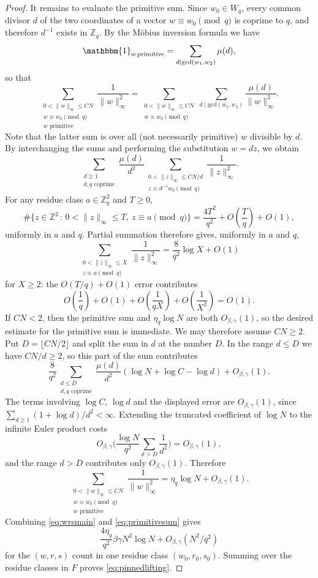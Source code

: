 \documentclass[11pt,reqno]{amsart}
\numberwithin{equation}{section}
\newcommand{\norm}[1]{\lVert #1\rVert_\infty}
\renewcommand{\leq}{\leqslant}
\renewcommand{\le}{\leqslant}
\renewcommand{\geq}{\geqslant}
\renewcommand{\ge}{\geqslant}
\begin{document}
\begin{proof}
It remains to evaluate the primitive sum. Since $w_0\in W_q$, every common divisor $d$ of the two coordinates of a vector $w\equiv w_0\pmod q$ is coprime to $q$, and therefore $d^{-1}$ exists in $\mathbb{Z}_{q}$. By the M\"{o}bius inversion formula we have
\[ \mathbbm{1}_{w\,\mathrm{primitive}} = \sum_{d\mid \mathrm{gcd}(w_1,w_2)}\mu(d), \]
so that
\[ \sum_{\substack{0<\norm{w}\le CN\\ w\equiv w_0\!\!\!\pmod q \\ w\text{ primitive}}} \frac1{\norm{w}^2}
= \sum_{\substack{0<\norm{w}\leq CN\\ w\equiv w_0\!\!\!\pmod q}}\sum_{d\mid \mathrm{gcd}(w_1,w_2)}
\frac{\mu(d)}{\norm{w}^{2}}. \]
Note that the latter sum is over all (not necessarily primitive) $w$ divisible by $d$. By interchanging the sums and performing the substitution $w=dz$, we obtain
\[ \sum_{\substack{d\ge1\\d,q\text{ coprime}}}\frac{\mu(d)}{d^2} \sum_{\substack{0<\norm{z}\le CN/d\\ z\equiv d^{-1}w_0\!\!\!\pmod q}} \frac1{\norm{z}^2}. \]
For any residue class $a\in\mathbb{Z}_q^2$ and $T\ge0$,
\[ \#\{z\in\mathbb{Z}^2 \,:\, 0<\norm{z}\le T, \ z\equiv a\!\!\!\pmod q\}
=\frac{4T^2}{q^2}+O\left(\frac{T}{q}\right)+O(1), \]
uniformly in $a$ and $q$. Partial summation therefore gives, uniformly in $a$ and $q$,
\[ \sum_{\substack{0<\norm{z}\le X\\ z\equiv a \!\!\!\pmod q}} \frac1{\norm{z}^2}
= \frac8{q^2}\log X+O(1) \]
for $X\ge2$: the $O(T/q)+O(1)$ error contributes
\[ O\left(\frac1q\right)+O(1)+O\left(\frac1{qX}\right)+O\left(\frac1{X^2}\right)=O(1). \]
If $CN<2$, then the primitive sum and $\eta_q\log N$ are both $O_{\beta,\gamma}(1)$, so the desired estimate for the primitive sum is immediate. We may therefore assume $CN\ge2$. Put $D=\lfloor CN/2\rfloor$ and split the sum in $d$ at the number $D$.
In the range $d\le D$ we have $CN/d\ge2$, so this part of the sum contributes
\[ \frac8{q^2} \sum_{\substack{d\le D\\d,q\text{ coprime}}}\frac{\mu(d)}{d^2} (\log N+\log C-\log d)+O_{\beta,\gamma}(1). \]
The terms involving $\log C$, $\log d$ and the displayed error are $O_{\beta,\gamma}(1)$, since $\sum_{d\geq1}(1+\log d)/d^2<\infty$. Extending the truncated coefficient of $\log N$ to the infinite Euler product costs
\[ O_{\beta,\gamma}\biggl(\frac{\log N}{q^2}\sum_{d>D}\frac1{d^2}\biggr)=O_{\beta,\gamma}(1), \]
and the range $d>D$ contributes only $O_{\beta,\gamma}(1)$. Therefore
\begin{equation}\label{eq:primitivesum}
\sum_{\substack{0<\norm{w}\le CN\\ w\equiv w_0\!\!\!\pmod q\\ w\text{ primitive}}} \frac1{\norm{w}^2}
=\eta_q\log N+O_{\beta,\gamma}(1).
\end{equation}
Combining \eqref{eq:wrsmain} and \eqref{eq:primitivesum} gives
\[ \frac{4\eta_q}{q^2}\beta\gamma N^2\log N + O_{\beta,\gamma}(N^2/q^2) \]
for the $(w,r,s)$ count in one residue class $(w_0,r_0,s_0)$. Summing over the residue classes in $F$ proves \eqref{eq:pinnedlifting}.


\end{proof}
\end{document}
